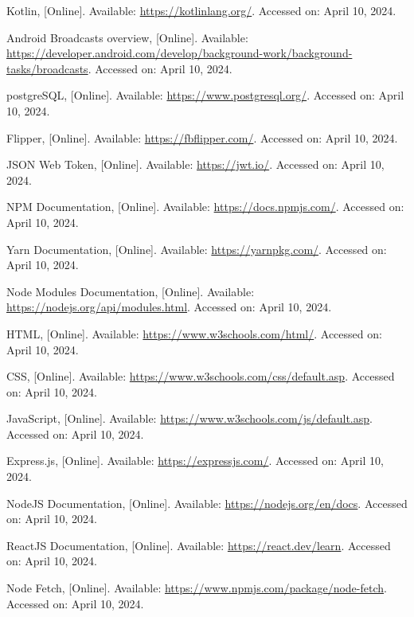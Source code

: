 \begin{thebibliography}{1}
    Kotlin, [Online].
    Available: \url{https://kotlinlang.org/}.
    Accessed on: April 10, 2024.

    Android Broadcasts overview, [Online].
    Available: \url{https://developer.android.com/develop/background-work/background-tasks/broadcasts}.
    Accessed on: April 10, 2024.

    postgreSQL, [Online].
    Available: \url{https://www.postgresql.org/}.
    Accessed on: April 10, 2024.

    Flipper, [Online].
    Available: \url{https://fbflipper.com/}.
    Accessed on: April 10, 2024.

    JSON Web Token, [Online].
    Available: \url{https://jwt.io/}.
    Accessed on: April 10, 2024.

    NPM Documentation, [Online].
    Available: \url{https://docs.npmjs.com/}.
    Accessed on: April 10, 2024.

    Yarn Documentation, [Online].
    Available: \url{https://yarnpkg.com/}.
    Accessed on: April 10, 2024.

    Node Modules Documentation, [Online].
    Available: \url{https://nodejs.org/api/modules.html}.
    Accessed on: April 10, 2024.

    HTML, [Online].
    Available: \url{https://www.w3schools.com/html/}.
    Accessed on: April 10, 2024.

    CSS, [Online].
    Available: \url{https://www.w3schools.com/css/default.asp}.
    Accessed on: April 10, 2024.

    JavaScript, [Online].
    Available: \url{https://www.w3schools.com/js/default.asp}.
    Accessed on: April 10, 2024.

    Express.js, [Online].
    Available: \url{https://expressjs.com/}.
    Accessed on: April 10, 2024.

    NodeJS Documentation, [Online].
    Available: \url{https://nodejs.org/en/docs}.
    Accessed on: April 10, 2024.

    ReactJS Documentation, [Online].
    Available: \url{https://react.dev/learn}.
    Accessed on: April 10, 2024.

    Node Fetch, [Online].
    Available: \url{https://www.npmjs.com/package/node-fetch}.
    Accessed on: April 10, 2024.


\end{thebibliography}
